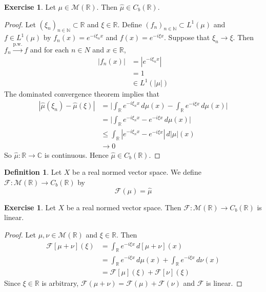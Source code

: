 \documentclass{book}
\theoremstyle{definition}
\newtheorem{defn}[definition]{Definition}
\newtheorem{ex}[definition]{Exercise}
\newcommand{\C}{\mathbb{C}}
\newcommand{\N}{\mathbb{N}}
\newcommand{\R}{\mathbb{R}}
\newcommand{\MF}{\mathcal{F}}
\newcommand{\MM}{\mathcal{M}}
\DeclareMathOperator*{\0}{\mbf{0}}
\DeclareMathOperator*{\1}{\mbf{1}}
\newcommand{\convt}[1]{\xrightarrow{\text{#1}}}
\newcommand{\dmu}{\, d \mu}
\newcommand{\dnu}{\, d \nu}
\begin{document}
	\begin{ex}
		Let $\mu \in \MM(\R)$. Then $\hat{\mu} \in C_b(\R)$.
	\end{ex}
	
	\begin{proof}
		Let $(\xi_{n})_{n \in \N} \subset \R$ and $\xi \in \R$. Define $(f_n)_{n \in \N} \subset L^1 (\mu)$ and $f \in L^1(\mu)$ by $f_n(x) = e^{-i \xi_n x}$ and $f(x) = e^{-i \xi x}$. Suppose that $\xi_n \rightarrow \xi$. Then $f_n \convt{p.w.} f$ and for each $n \in N$ and $x \in \R$, 
		\begin{align*}
			|f_n(x)|
			&= |e^{-i \xi_n x}| \\
			& = 1 \\
			& \in L^1(|\mu|)
		\end{align*}
		The dominated convergence theorem implies that
		\begin{align*}
			|\hat{\mu}(\xi_n) - \hat{\mu}(\xi)| 
			& = \bigg| \int_{\R} e^{-i \xi_n x} \dmu(x) - \int_{\R} e^{-i \xi x} \dmu(x)\bigg| \\
			& =  \bigg| \int_{\R} e^{-i \xi_n x} - e^{-i \xi x} \dmu(x) \bigg| \\
			& \leq \int_{\R} |e^{-i \xi_n x} - e^{-i \xi x}| \, d|\mu|(x) \\
			& \rightarrow 0
		\end{align*}
		So $\hat{\mu}: \R \rightarrow \C$ is continuous. Hence $\hat{\mu} \in C_b(\R)$.
	\end{proof}
	
	\begin{defn}
		Let $X$ be a real normed vector space. We define $\MF: \MM(\R) \rightarrow C_b(\R)$ by $$\MF(\mu) = \hat{\mu}$$
	\end{defn}
	
	\begin{ex}
		Let $X$ be a real normed vector space. Then $\MF: \MM(\R) \rightarrow C_b(\R)$ is linear.
	\end{ex}
	
	\begin{proof}
		Let $\mu, \nu \in \MM(\R)$ and $\xi \in \R$. Then 
		\begin{align*}
			\MF[\mu + \nu](\xi) 
			& = \int_{\R} e^{-i \xi x} \, d[\mu + \nu](x) \\
			& = \int_{\R} e^{-i \xi x} \dmu(x) + \int_{\R} e^{-i \xi x} \dnu(x) \\
			& = \MF[\mu](\xi) + \MF[\nu](\xi) 
		\end{align*}
		Since $\xi \in \R$ is arbitrary, $\MF(\mu + \nu) = \MF(\mu) + \MF(\nu)$ and $\MF$ is linear.
	\end{proof}
	
\end{document}
